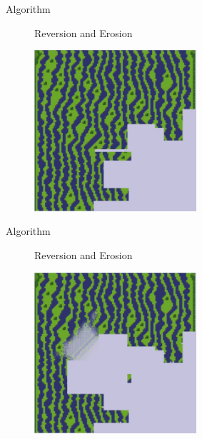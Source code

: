 \documentclass{beamer}
\begin{document}
%
%
%

  \begin{frame}[fragile]{Algorithm}

    \begin{figure}
      Reversion and Erosion

      \includegraphics[width=6cm]{img/fm_0035.pdf}

    \end{figure}
  \end{frame}

  \begin{frame}[fragile]{Algorithm}

    \begin{figure}
      Reversion and Erosion

      \includegraphics[width=6cm]{img/fm_0036.pdf}

    \end{figure}
  \end{frame}
\end{document}
